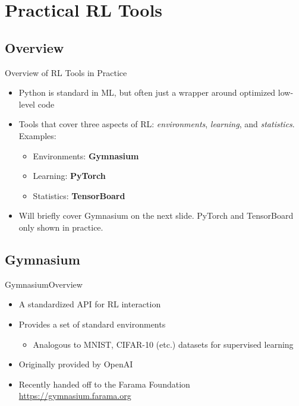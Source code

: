 \documentclass[aspectratio=1609,ADDITIONAL_DOCCLASS_ARGS]{beamer}
\begin{document}
\section{Practical RL Tools}
\subsection{Overview}

\begin{frame}{Overview of RL Tools in Practice}
  \begin{itemize}
  \setlength\itemsep{2mm}
  \item<1-> Python is standard in ML, but often just a wrapper around optimized
        low-level code
  \item<2-> Tools that cover three aspects of RL: \emph{environments},
        \emph{learning}, and \emph{statistics}. Examples:
        \begin{itemize}
        \item Environments: \textbf{Gymnasium}
        \item Learning: \textbf{PyTorch}
        \item Statistics: \textbf{TensorBoard}
        \end{itemize}
  \item<3-> Will briefly cover Gymnasium on the next slide. PyTorch and TensorBoard
        only shown in practice.
  \end{itemize}
\end{frame}


\AtBeginSubsection[]{}

\subsection{Gymnasium}

\begin{frame}{Gymnasium}{Overview}
  \begin{itemize}
  \setlength\itemsep{2mm}
  \item<1-> A standardized API for RL interaction
  \item<2-> Provides a set of standard environments
        \begin{itemize}
        \item Analogous to MNIST, CIFAR-10 (etc.) datasets for supervised learning
        \end{itemize}
  \item<3-> Originally provided by OpenAI
  \item<4-> Recently handed off to the Farama Foundation\\
        \url{https://gymnasium.farama.org}
  \end{itemize}
\end{frame}
\end{document}
